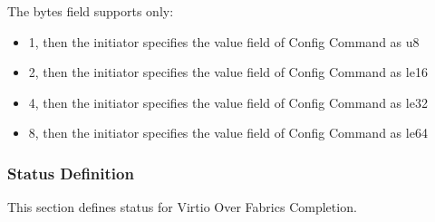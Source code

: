 The bytes field supports only:

\begin{itemize}
\item 1, then the initiator specifies the value field of Config Command as u8
\item 2, then the initiator specifies the value field of Config Command as le16
\item 4, then the initiator specifies the value field of Config Command as le32
\item 8, then the initiator specifies the value field of Config Command as le64
\end{itemize}

\subsubsection{Status Definition}\label{sec:Virtio Transport Options / Virtio Over Fabrics / Transmition Protocol / Status Definition}
This section defines status for Virtio Over Fabrics Completion.

